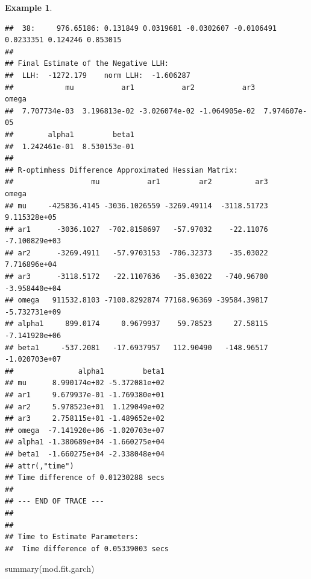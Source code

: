 \documentclass[
]{book}
\newenvironment{Shaded}{\begin{snugshade}}{\end{snugshade}}
\newcommand{\FunctionTok}[1]{\textcolor[rgb]{0.00,0.00,0.00}{#1}}
\newcommand{\NormalTok}[1]{#1}
\theoremstyle{definition}
\theoremstyle{definition}
\newtheorem{example}{Example}[chapter]
\theoremstyle{definition}
\theoremstyle{definition}
\theoremstyle{remark}
\begin{document}
\begin{example}
\begin{verbatim}
##  38:     976.65186: 0.131849 0.0319681 -0.0302607 -0.0106491 0.0233351 0.124246 0.853015
## 
## Final Estimate of the Negative LLH:
##  LLH:  -1272.179    norm LLH:  -1.606287 
##            mu           ar1           ar2           ar3         omega 
##  7.707734e-03  3.196813e-02 -3.026074e-02 -1.064905e-02  7.974607e-05 
##        alpha1         beta1 
##  1.242461e-01  8.530153e-01 
## 
## R-optimhess Difference Approximated Hessian Matrix:
##                  mu           ar1         ar2          ar3         omega
## mu     -425836.4145 -3036.1026559 -3269.49114  -3118.51723  9.115328e+05
## ar1      -3036.1027  -702.8158697   -57.97032    -22.11076 -7.100829e+03
## ar2      -3269.4911   -57.9703153  -706.32373    -35.03022  7.716896e+04
## ar3      -3118.5172   -22.1107636   -35.03022   -740.96700 -3.958440e+04
## omega   911532.8103 -7100.8292874 77168.96369 -39584.39817 -5.732731e+09
## alpha1     899.0174     0.9679937    59.78523     27.58115 -7.141920e+06
## beta1     -537.2081   -17.6937957   112.90490   -148.96517 -1.020703e+07
##               alpha1         beta1
## mu      8.990174e+02 -5.372081e+02
## ar1     9.679937e-01 -1.769380e+01
## ar2     5.978523e+01  1.129049e+02
## ar3     2.758115e+01 -1.489652e+02
## omega  -7.141920e+06 -1.020703e+07
## alpha1 -1.380689e+04 -1.660275e+04
## beta1  -1.660275e+04 -2.338048e+04
## attr(,"time")
## Time difference of 0.01230288 secs
## 
## --- END OF TRACE ---
## 
## 
## Time to Estimate Parameters:
##  Time difference of 0.05339003 secs
\end{verbatim}

\begin{Shaded}
\begin{Highlighting}[]
\FunctionTok{summary}\NormalTok{(mod.fit.garch)}
\end{Highlighting}
\end{Shaded}


\end{example}
\end{document}
